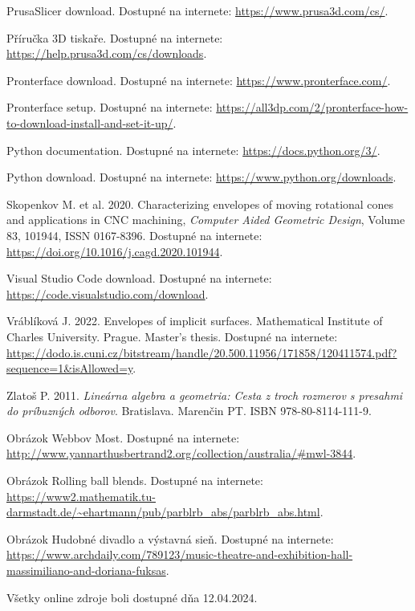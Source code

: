 \documentclass[12pt, twoside]{book}
\theoremstyle{definition}
\begin{document}
\begin{thebibliography}{99}
 PrusaSlicer download. Dostupné na internete: \url{https://www.prusa3d.com/cs/}.

 Příručka 3D tiskaře. Dostupné na internete: \url{https://help.prusa3d.com/cs/downloads}.

 Pronterface download. Dostupné na internete: \url{https://www.pronterface.com/}.

 Pronterface setup. Dostupné na internete: \url{https://all3dp.com/2/pronterface-how-to-download-install-and-set-it-up/}.

 Python documentation. Dostupné na internete: \url{https://docs.python.org/3/}.

 Python download. Dostupné na internete: \url{https://www.python.org/downloads}.

 Skopenkov M. et al. 2020. Characterizing envelopes of moving rotational cones and applications in CNC machining, \textit{Computer Aided Geometric Design}, Volume 83, 101944, ISSN 0167-8396. Dostupné na internete: \url{https://doi.org/10.1016/j.cagd.2020.101944}.

 Visual Studio Code download. Dostupné na internete: \url{https://code.visualstudio.com/download}.

 Vráblíková J. 2022. Envelopes of implicit surfaces. Mathematical Institute of Charles University. Prague. Master's thesis. Dostupné na internete: \url{https://dodo.is.cuni.cz/bitstream/handle/20.500.11956/171858/120411574.pdf?sequence=1&isAllowed=y}.

 Zlatoš P. 2011. \textit{Lineárna algebra a geometria: Cesta z troch rozmerov s presahmi do príbuzných odborov}. Bratislava. Marenčin PT. ISBN 978-80-8114-111-9.

 Obrázok Webbov Most. Dostupné na internete: \url{http://www.yannarthusbertrand2.org/collection/australia/#mwl-3844}.

 Obrázok Rolling ball blends. Dostupné na internete:  \url{https://www2.mathematik.tu-darmstadt.de/~ehartmann/pub/parblrb_abs/parblrb_abs.html}.

 Obrázok Hudobné divadlo a výstavná sieň. Dostupné na internete:  \url{https://www.archdaily.com/789123/music-theatre-and-exhibition-hall-massimiliano-and-doriana-fuksas}.


Všetky online zdroje boli dostupné dňa 12.04.2024.



\end{thebibliography}
\end{document}
